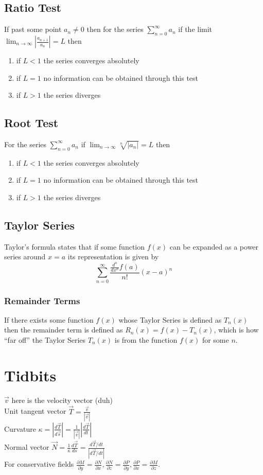 \documentclass[10pt,landscape,letterpaper]{cheatsheet}
\begin{document}
\subsection*{Ratio Test}
If past some point $a_n\neq 0$ then for the series $\sum_{n=0}^{\infty}a_n$
if the limit $\lim_{n \to \infty} \left|\frac{a_{n+1}}{a_n}\right|=L$ then
\begin{enumerate}[label=(\alph*)]
        \item if $L<1$ the series converges absolutely
        \item if $L=1$ no information can be obtained through this test
        \item if $L>1$ the series diverges
\end{enumerate}
\subsection*{Root Test}
For the series $\sum_{n=0}^{\infty}a_n$ if $\lim_{n \to \infty}\sqrt[n]{|a_n|}=L$ then
\begin{enumerate}[label=(\alph*)]
        \item if $L<1$ the series converges absolutely
        \item if $L=1$ no information can be obtained through this test
        \item if $L>1$ the series diverges
\end{enumerate}
\subsection*{Taylor Series}
Taylor's formula states that if some function $f(x)$ can be expanded as a power series around $x=a$
its representation is given by $$\sum_{n=0}^{\infty}\frac{\frac{d^n}{dx^n}f(a)}{n!}(x-a)^n$$
\subsubsection*{Remainder Terms}
If there exists some function $f(x)$ whose Taylor Series is defined as $T_n(x)$ then the remainder term is
defined as $R_n(x)=f(x)-T_n(x)$, which is how ``far off'' the Taylor Series $T_n(x)$ is from the function $f(x)$
for some $n$.
\section*{Tidbits}
$\vec{v}$ here is the velocity vector (duh)\\
Unit tangent vector $\vec{T}=\frac{\vec{v}}{\left|\vec{v}\right|}$\\
Curvature $\kappa=\left|\frac{d\vec{T}}{d\vec{s}}\right|=\frac{1}{\left|\vec{v}\right|}\left|\frac{d\vec{T}}{dt}\right|$\\
Normal vector $\vec{N}=\frac{1}{\kappa}\frac{d\vec{T}}{ds}=\frac{d\vec{T}/dt}{\left|d\vec{T}/dt\right|}$\\
For conservative fields
$\frac{\partial M}{\partial y}=\frac{\partial N}{\partial x},
        \frac{\partial N}{\partial z}=\frac{\partial P}{\partial y},
        \frac{\partial P}{\partial x}=\frac{\partial M}{\partial z}.
$
\end{document}
